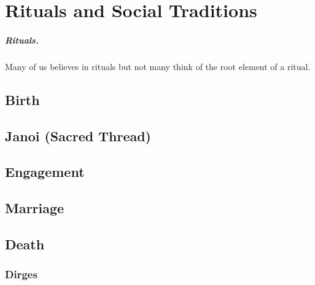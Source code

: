 \chapter{Rituals and Social Traditions}
\paragraph{Rituals.} Many of us believes in rituals but not many think of the
root element of a ritual. 
\section{Birth}
\section{Janoi (Sacred Thread)}
\section{Engagement}
\section{Marriage}
\section{Death}
\subsection{Dirges}
